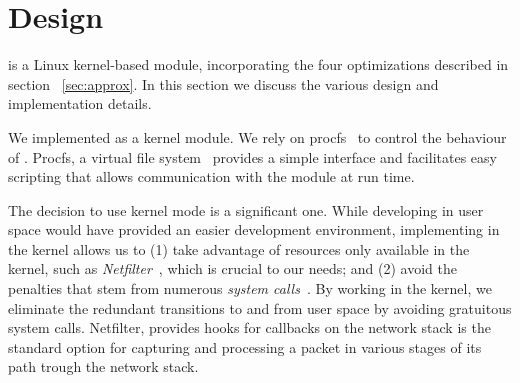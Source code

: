 \section{\oursys Design}\label{sec:design}
\oursys is a Linux kernel-based module, incorporating the four optimizations described in section ~\ref{sec:approx}. In this section we discuss the various design and implementation details. 

 We implemented \oursys as a kernel module. We rely on procfs~\cite{proc} to control the behaviour of \oursys. Procfs, a virtual file system~\cite{virtfs} provides a simple interface and facilitates easy scripting that allows communication with the module at run time.

The decision to use kernel mode is a significant one. While developing in user space would have provided an easier development environment, implementing \oursys in the kernel allows us to (1) take advantage of resources only available in the kernel, such as \textit{Netfilter}~\cite{netfilter}, which is crucial to our needs; and (2) avoid the penalties that stem from numerous \textit{system calls}~\cite{Copy, FlexSC}. By working in the kernel, we eliminate the redundant transitions to and from user space by avoiding gratuitous system calls. Netfilter, provides hooks for callbacks on the network stack is the standard option for capturing and processing a packet in various stages of its path trough the network stack.  


